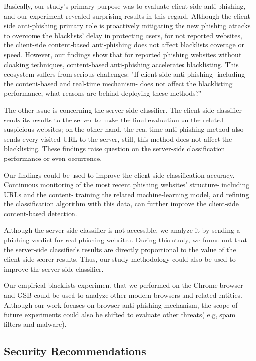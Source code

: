 \documentclass[letterpaper,twocolumn,10pt]{article}
\begin{document}
Basically, our study's primary purpose was to evaluate client-side anti-phishing, and our experiment revealed surprising results in this regard. Although the client-side anti-phishing primary role is proactively mitigating the new phishing attacks to overcome the blacklists' delay in protecting users, for not reported websites, the client-side content-based anti-phishing does not affect blacklists coverage or speed. However, our findings show that for reported phishing websites without cloaking techniques, content-based anti-phishing accelerates blacklisting. This ecosystem suffers from serious challenges: "If client-side anti-phishing- including the content-based and real-time mechanism- does not affect the blacklisting performance, what reasons are behind deploying these methods?"

The other issue is concerning the server-side classifier. The client-side classifier sends its results to the server to make the final evaluation on the related suspicious websites; on the other hand, the real-time anti-phishing method also sends every visited URL to the server, still, this method does not affect the blacklisting. These findings raise question on the server-side classification performance or even occurrence.

Our findings could be used to improve the client-side classification accuracy. Continuous monitoring of the most recent phishing websites' structure- including URLs and the content- training the related machine-learning model, and refining the classification algorithm with this data, can further improve the client-side content-based detection.

Although the server-side classifier is not accessible, we analyze it by sending a phishing verdict for real phishing websites. During this study, we found out that the server-side classifier's results are directly proportional to the value of the client-side scorer results. Thus, our study methodology could also be used to improve the server-side classifier.

Our empirical blacklists experiment that we performed on the Chrome browser and GSB could be used to analyze other modern browsers and related entities. 
Although our work focuses on browser anti-phishing mechanism, the scope of future experiments could also be shifted to evaluate other threats( e.g, spam filters and  malware). 

\subsection{Security Recommendations}
\end{document}
